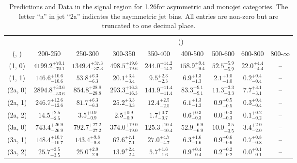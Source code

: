 \begin{table}[h!]
\tiny
\centering
\caption{Predictions and Data in the signal region for 1.26\ifb for asymmetric and monojet categories. The letter ``a'' in jet \eg ``2a''  indicates the asymmetric jet bins. All entries are non-zero but are truncated to one decimal place.\label{tab:yieldsseppost_sig_ewk_asym}}
\begin{tabular}
{ccccccccc}
	\hline\hline
&	& \multicolumn{8}{c}{\scalht (\gev)} \\ 
	 (\njet,  \nb) & 200-250 & 250-300 & 300-350 & 350-400 & 400-500 & 500-600 & 600-800 & 800-$\infty$ \\ [0.8ex] 
\hline
	(1, 0) & $4199.2^{+ 70.1 }_{- 70.1 }$ & $1349.4^{+ 37.3 }_{- 37.3 }$ & $498.5^{+ 19.6 }_{- 19.6 }$ & $244.0^{+ 14.2 }_{- 14.2 }$ & $158.9^{+ 9.4 }_{- 9.4 }$ & $52.5^{+ 5.9 }_{- 5.9 }$ & $22.0^{+ 4.4 }_{- 4.4 }$ & -- \\[0.5ex] 
	(1, 1) & $146.6^{+ 10.6 }_{- 10.6 }$ & $53.8^{+ 6.3 }_{- 6.3 }$ & $20.1^{+ 3.4 }_{- 3.4 }$ & $9.5^{+ 2.3 }_{- 2.3 }$ & $6.9^{+ 1.3 }_{- 1.3 }$ & $2.1^{+ 1.0 }_{- 1.0 }$ & $0.2^{+ 0.4 }_{- 0.4 }$ & -- \\[0.5ex] 
	(2a, 0) & $2894.8^{+ 53.6 }_{- 53.6 }$ & $854.8^{+ 28.8 }_{- 28.8 }$ & $293.3^{+ 16.3 }_{- 16.3 }$ & $141.9^{+ 11.4 }_{- 11.4 }$ & $83.3^{+ 9.1 }_{- 9.1 }$ & $11.3^{+ 3.3 }_{- 3.3 }$ & $7.7^{+ 3.1 }_{- 3.1 }$ & -- \\[0.5ex] 
	(2a, 1) & $246.7^{+ 12.6 }_{- 12.6 }$ & $81.7^{+ 6.3 }_{- 6.3 }$ & $25.2^{+ 3.3 }_{- 3.3 }$ & $12.4^{+ 2.5 }_{- 2.5 }$ & $6.1^{+ 1.3 }_{- 1.3 }$ & $0.9^{+ 0.5 }_{- 0.5 }$ & $0.3^{+ 0.4 }_{- 0.4 }$ & -- \\[0.5ex] 
	(2a, 2) & $14.5^{+ 2.5 }_{- 2.5 }$ & $3.5^{+ 0.9 }_{- 0.9 }$ & $2.5^{+ 0.9 }_{- 0.9 }$ & $1.7^{+ 0.7 }_{- 0.7 }$ & $0.6^{+ 0.3 }_{- 0.3 }$ & $0.0^{+ 0.3 }_{- 0.3 }$ & $0.1^{+ 0.2 }_{- 0.2 }$ & -- \\[0.5ex] 
	(3a, 0) & $743.4^{+ 26.9 }_{- 26.9 }$ & $792.7^{+ 27.2 }_{- 27.2 }$ & $374.0^{+ 19.0 }_{- 19.0 }$ & $125.3^{+ 10.4 }_{- 10.4 }$ & $52.9^{+ 6.9 }_{- 6.9 }$ & $10.0^{+ 3.5 }_{- 3.5 }$ & $3.4^{+ 2.0 }_{- 2.0 }$ & -- \\[0.5ex] 
	(3a, 1) & $148.4^{+ 10.7 }_{- 10.7 }$ & $143.4^{+ 9.8 }_{- 9.8 }$ & $62.6^{+ 7.1 }_{- 7.1 }$ & $27.0^{+ 4.7 }_{- 4.7 }$ & $6.3^{+ 1.6 }_{- 1.6 }$ & $0.9^{+ 0.6 }_{- 0.6 }$ & $0.7^{+ 0.8 }_{- 0.8 }$ & -- \\[0.5ex] 
	(3a, 2) & $25.7^{+ 3.5 }_{- 3.5 }$ & $25.0^{+ 2.9 }_{- 2.9 }$ & $13.9^{+ 2.4 }_{- 2.4 }$ & $5.7^{+ 1.6 }_{- 1.6 }$ & $0.9^{+ 0.4 }_{- 0.4 }$ & $0.2^{+ 0.2 }_{- 0.2 }$ & $0.0^{+ 0.1 }_{- 0.1 }$ & -- \\[0.5ex] 

\end{tabular}
\end{table}
